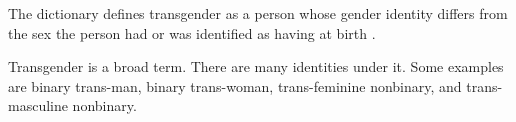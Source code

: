 The dictionary defines transgender as a person whose gender identity differs 
from the sex the person had or was identified as having at birth 
\cite{transgender-def}.

Transgender is a broad term. There are many identities under it. Some examples are 
binary trans-man, binary trans-woman, trans-feminine nonbinary, and trans-masculine 
nonbinary.

